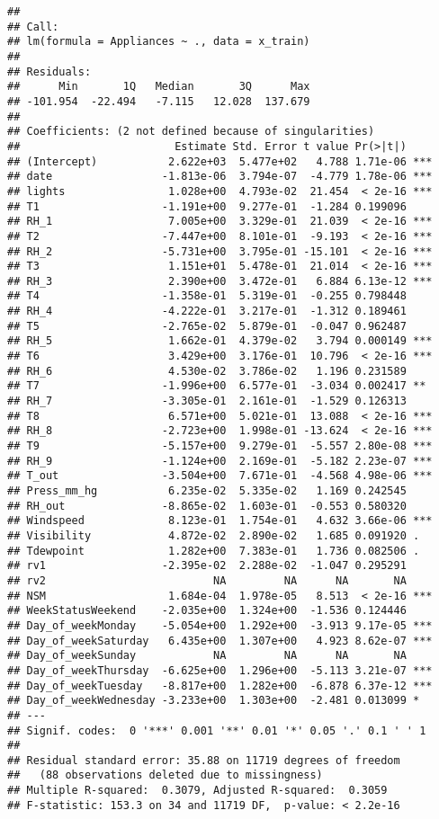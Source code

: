 \documentclass[
]{article}
\begin{document}
\begin{verbatim}
## 
## Call:
## lm(formula = Appliances ~ ., data = x_train)
## 
## Residuals:
##      Min       1Q   Median       3Q      Max 
## -101.954  -22.494   -7.115   12.028  137.679 
## 
## Coefficients: (2 not defined because of singularities)
##                        Estimate Std. Error t value Pr(>|t|)    
## (Intercept)           2.622e+03  5.477e+02   4.788 1.71e-06 ***
## date                 -1.813e-06  3.794e-07  -4.779 1.78e-06 ***
## lights                1.028e+00  4.793e-02  21.454  < 2e-16 ***
## T1                   -1.191e+00  9.277e-01  -1.284 0.199096    
## RH_1                  7.005e+00  3.329e-01  21.039  < 2e-16 ***
## T2                   -7.447e+00  8.101e-01  -9.193  < 2e-16 ***
## RH_2                 -5.731e+00  3.795e-01 -15.101  < 2e-16 ***
## T3                    1.151e+01  5.478e-01  21.014  < 2e-16 ***
## RH_3                  2.390e+00  3.472e-01   6.884 6.13e-12 ***
## T4                   -1.358e-01  5.319e-01  -0.255 0.798448    
## RH_4                 -4.222e-01  3.217e-01  -1.312 0.189461    
## T5                   -2.765e-02  5.879e-01  -0.047 0.962487    
## RH_5                  1.662e-01  4.379e-02   3.794 0.000149 ***
## T6                    3.429e+00  3.176e-01  10.796  < 2e-16 ***
## RH_6                  4.530e-02  3.786e-02   1.196 0.231589    
## T7                   -1.996e+00  6.577e-01  -3.034 0.002417 ** 
## RH_7                 -3.305e-01  2.161e-01  -1.529 0.126313    
## T8                    6.571e+00  5.021e-01  13.088  < 2e-16 ***
## RH_8                 -2.723e+00  1.998e-01 -13.624  < 2e-16 ***
## T9                   -5.157e+00  9.279e-01  -5.557 2.80e-08 ***
## RH_9                 -1.124e+00  2.169e-01  -5.182 2.23e-07 ***
## T_out                -3.504e+00  7.671e-01  -4.568 4.98e-06 ***
## Press_mm_hg           6.235e-02  5.335e-02   1.169 0.242545    
## RH_out               -8.865e-02  1.603e-01  -0.553 0.580320    
## Windspeed             8.123e-01  1.754e-01   4.632 3.66e-06 ***
## Visibility            4.872e-02  2.890e-02   1.685 0.091920 .  
## Tdewpoint             1.282e+00  7.383e-01   1.736 0.082506 .  
## rv1                  -2.395e-02  2.288e-02  -1.047 0.295291    
## rv2                          NA         NA      NA       NA    
## NSM                   1.684e-04  1.978e-05   8.513  < 2e-16 ***
## WeekStatusWeekend    -2.035e+00  1.324e+00  -1.536 0.124446    
## Day_of_weekMonday    -5.054e+00  1.292e+00  -3.913 9.17e-05 ***
## Day_of_weekSaturday   6.435e+00  1.307e+00   4.923 8.62e-07 ***
## Day_of_weekSunday            NA         NA      NA       NA    
## Day_of_weekThursday  -6.625e+00  1.296e+00  -5.113 3.21e-07 ***
## Day_of_weekTuesday   -8.817e+00  1.282e+00  -6.878 6.37e-12 ***
## Day_of_weekWednesday -3.233e+00  1.303e+00  -2.481 0.013099 *  
## ---
## Signif. codes:  0 '***' 0.001 '**' 0.01 '*' 0.05 '.' 0.1 ' ' 1
## 
## Residual standard error: 35.88 on 11719 degrees of freedom
##   (88 observations deleted due to missingness)
## Multiple R-squared:  0.3079, Adjusted R-squared:  0.3059 
## F-statistic: 153.3 on 34 and 11719 DF,  p-value: < 2.2e-16
\end{verbatim}
\end{document}
